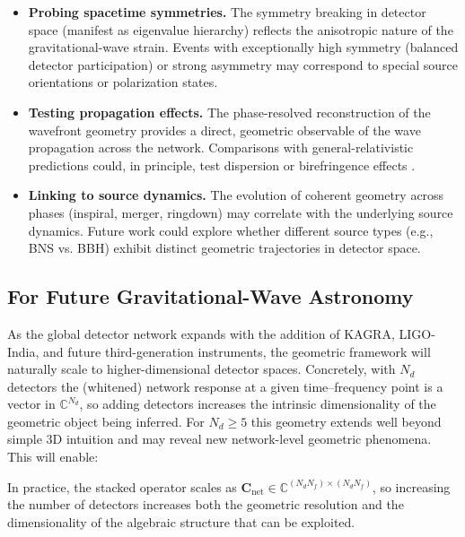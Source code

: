 \documentclass[11pt,a4paper]{article}
\begin{document}
\begin{itemize}
    \item \textbf{Probing spacetime symmetries.} The symmetry breaking in detector space (manifest as eigenvalue hierarchy) reflects the anisotropic nature of the gravitational-wave strain. Events with exceptionally high symmetry (balanced detector participation) or strong asymmetry may correspond to special source orientations or polarization states.

    \item \textbf{Testing propagation effects.} The phase-resolved reconstruction of the wavefront geometry provides a direct, geometric observable of the wave propagation across the network. Comparisons with general-relativistic predictions could, in principle, test dispersion or birefringence effects \cite{Yunes2016, Abbott2025GRTestsGWTC3}.

    \item \textbf{Linking to source dynamics.} The evolution of coherent geometry across phases (inspiral, merger, ringdown) may correlate with the underlying source dynamics. Future work could explore whether different source types (e.g., BNS vs. BBH) exhibit distinct geometric trajectories in detector space.
\end{itemize}

\subsection{For Future Gravitational-Wave Astronomy}
As the global detector network expands with the addition of KAGRA, LIGO-India, and future third-generation instruments, the geometric framework will naturally scale to higher-dimensional detector spaces. Concretely, with $N_d$ detectors the (whitened) network response at a given time--frequency point is a vector in $\mathbb{C}^{N_d}$, so adding detectors increases the intrinsic dimensionality of the geometric object being inferred. For $N_d\ge 5$ this geometry extends well beyond simple 3D intuition and may reveal new network-level geometric phenomena. This will enable:

In practice, the stacked operator scales as $\mathbf{C}_{\mathrm{net}}\in\mathbb{C}^{(N_d N_f)\times(N_d N_f)}$, so increasing the number of detectors increases both the geometric resolution and the dimensionality of the algebraic structure that can be exploited.
\end{document}
